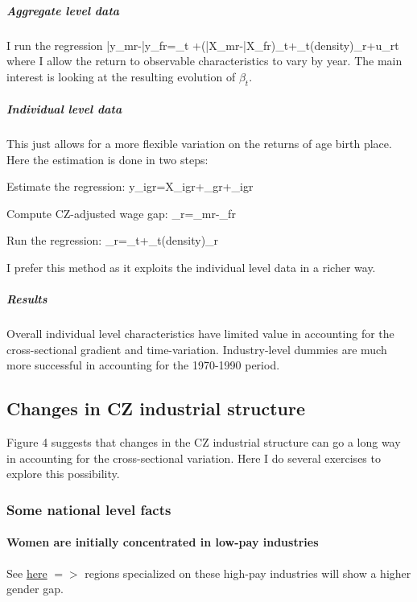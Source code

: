\subparagraph{Aggregate level data}
I run the regression
\beqns
	\bar{y}_{mr}-\bar{y}_{fr}=\alpha_t +(\bar{X}_{mr}-\bar{X}_{fr})\gamma_t+\beta_t\log(density)_r+u_{rt}
\eeqns
where I allow the return to observable characteristics to vary by year. The main interest is looking at the resulting evolution of $\beta_t$.

\subparagraph{Individual level data}
This just allows for a more flexible variation on the returns of age birth place. Here the estimation is done in two steps:
\benu
	\item Estimate the regression:
	\beqn
		y_{igr}=X_{igr}\gamma+\lambda_{gr}+\varepsilon_{igr}
	\eeqn
	\item Compute CZ-adjusted wage gap:
	\beqns
		\tau_r=\lambda_{mr}-\lambda_{fr}
	\eeqns
	\item Run the regression:
	\beqns
	\tau_r=\alpha_t+\beta_t\log(density)_r
	\eeqns
\eenu

I prefer this method as it exploits the individual level data in a richer way.


\subparagraph{Results} 
 Overall individual level characteristics have limited value in accounting for the cross-sectional gradient and time-variation. Industry-level dummies are much more successful in accounting for the 1970-1990 period.


\FloatBarrier

\FloatBarrier



\subsection{Changes in CZ industrial structure}
Figure 4 suggests that changes in the CZ industrial structure can go a long way in accounting for the cross-sectional variation. Here I do several exercises to explore this possibility.

\subsubsection{Some national level facts}
\paragraph{Women are initially concentrated in low-pay industries}
See \href{https://www.dropbox.com/s/lfpo3q5i9mvq8ry/employment_distribution_gender_full_time.png?dl=0}{here} $=> $ regions specialized on these high-pay industries will show a higher gender gap.


